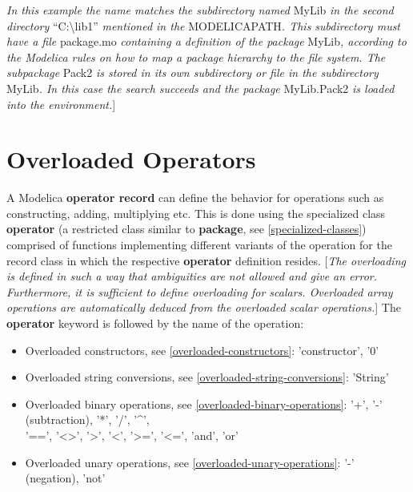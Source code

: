 \documentclass[10pt,a4paper]{report}
\def\doublelabel#1{\label{#1}\hypertarget{#1}{}}
\begin{document}
\emph{In this example the name matches the subdirectory named} MyLib
\emph{in the second directory} ``C:\textbackslash{}lib1''
\emph{mentioned in the} MODELICAPATH\emph{. This subdirectory must have
a file} package.mo \emph{containing a definition of the package}
MyLib\emph{, according to the Modelica rules on how to map a package
hierarchy to the file system. The subpackage} Pack2 \emph{is stored in
its own subdirectory or file in the subdirectory} MyLib\emph{. In this
case the search succeeds and the package} MyLib.Pack2 \emph{is loaded
into the environment.}{]}

\chapter{Overloaded Operators}\doublelabel{overloaded-operators}

A Modelica \textbf{operator record} can define the behavior for
operations such as constructing, adding, multiplying etc. This is done
using the specialized class \textbf{operator} (a restricted class
similar to \textbf{package}, see \ref{specialized-classes}) comprised of functions
implementing different variants of the operation for the record class in
which the respective \textbf{operator} definition resides. {[}\emph{The
overloading is defined in such a way that ambiguities are not allowed
and give an error. Furthermore, it is sufficient to define overloading
for scalars. Overloaded array operations are automatically deduced from
the overloaded scalar operations.}{]} The \textbf{operator} keyword is
followed by the name of the operation:

\begin{itemize}
\item
Overloaded constructors, see \ref{overloaded-constructors}:\newline
'constructor', '0'
\item
Overloaded string conversions, see \ref{overloaded-string-conversions}:\newline
'String'
\item
Overloaded binary operations, see \ref{overloaded-binary-operations}:\newline
'+', '-' (subtraction), '*', '/', '\^{}',\\
'==', '\textless{}\textgreater{}', '\textgreater{}', '\textless{}',
'\textgreater{}=', '\textless{}=', 'and', 'or'
\item
Overloaded unary operations, see \ref{overloaded-unary-operations}:\newline
'-' (negation), 'not'
\end{itemize}
\end{document}
